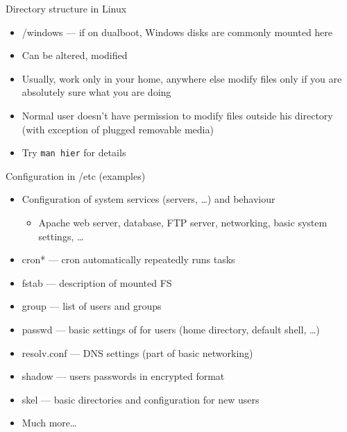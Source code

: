 \documentclass[hyperref={bookmarks=true, unicode=true, colorlinks=true, pdftitle={Linux, command line and MetaCentrum}, plainpages=false, pdfauthor={Vojtech Zeisek}, pdfsubject={Course about use of Linux command line, writing shell scripts and using MetaCentrum of CESNET}, pdfcreator={XeLaTeX, http://www.xelatex.org/}, pdfkeywords={Linux, GNU, BASH, shell, command line, MetaCentrum}, linkcolor=Sienna, anchorcolor=black, citecolor=green, filecolor=magenta, menucolor=Sienna, urlcolor=cyan, pdftex}, compress, ucs, xelatex, xcolor=svgnames, 11pt]{beamer}
\begin{document}
\begin{frame}[allowframebreaks]{Directory structure in Linux}
\begin{itemize}
  \item \alert{/windows} --- if on dualboot, Windows disks are commonly mounted here
  \item Can be altered, modified
  \item Usually, work only in your home, anywhere else modify files only if you are absolutely sure what you are doing
  \item Normal user doesn't have permission to modify files outside his directory (with exception of plugged removable media)
  \item Try \texttt{man hier} for details
\end{itemize}
\end{frame}

\begin{frame}{Configuration in /etc (examples)}
\begin{itemize}
  \item Configuration of system services (servers, \ldots) and behaviour
  \begin{itemize}
    \item Apache web server, database, FTP server, networking, basic system settings, \ldots
  \end{itemize}
  \item cron* --- cron automatically repeatedly runs tasks
  \item fstab --- description of mounted FS
  \item group --- list of users and groups
  \item passwd --- basic settings of for users (home directory, default shell, \ldots)
  \item resolv.conf ---  DNS settings (part of basic networking)
  \item shadow --- users passwords in encrypted format
  \item skel --- basic directories and configuration for new users
  \item Much more\ldots
\end{itemize}
\end{frame}
\end{document}
